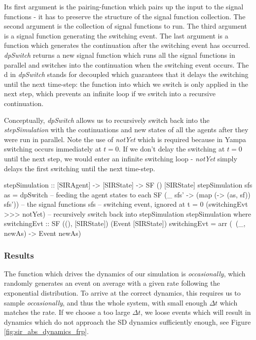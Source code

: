 Its first argument is the pairing-function which pairs up the input to the signal functions - it has to preserve the structure of the signal function collection. The second argument is the collection of signal functions to run. The third argument is a signal function generating the switching event. The last argument is a function which generates the continuation after the switching event has occurred. \textit{dpSwitch} returns a new signal function which runs all the signal functions in parallel and switches into the continuation when the switching event occurs. The d in \textit{dpSwitch} stands for decoupled which guarantees that it delays the switching until the next time-step: the function into which we switch is only applied in the next step, which prevents an infinite loop if we switch into a recursive continuation.

Conceptually, \textit{dpSwitch} allows us to recursively switch back into the \textit{stepSimulation} with the continuations and new states of all the agents after they were run in parallel. Note the use of \textit{notYet} which is required because in Yampa switching occurs immediately at $t = 0$. If we don't delay the switching at $t = 0$ until the next step, we would enter an infinite switching loop - \textit{notYet} simply delays the first switching until the next time-step.


\begin{HaskellCode}
stepSimulation :: [SIRAgent] -> [SIRState] -> SF () [SIRState]
stepSimulation sfs as =
    dpSwitch
      -- feeding the agent states to each SF
      (\_ sfs' -> (map (\sf -> (as, sf)) sfs'))
      -- the signal functions
      sfs
      -- switching event, ignored at t = 0         
      (switchingEvt >>> notYet)
      -- recursively switch back into stepSimulation         
      stepSimulation                            
  where
    switchingEvt :: SF ((), [SIRState]) (Event [SIRState])
    switchingEvt = arr (\ (_, newAs) -> Event newAs)
\end{HaskellCode}

\subsubsection{Results}
The function which drives the dynamics of our simulation is \textit{occasionally}, which randomly generates an event on average with a given rate following the exponential distribution. To arrive at the correct dynamics, this requires us to sample \textit{occasionally}, and thus the whole system, with small enough $\Delta t$ which matches the rate. If we choose a too large $\Delta t$, we loose events which will result in dynamics which do not approach the SD dynamics sufficiently enough, see Figure \ref{fig:sir_abs_dynamics_frp}.

